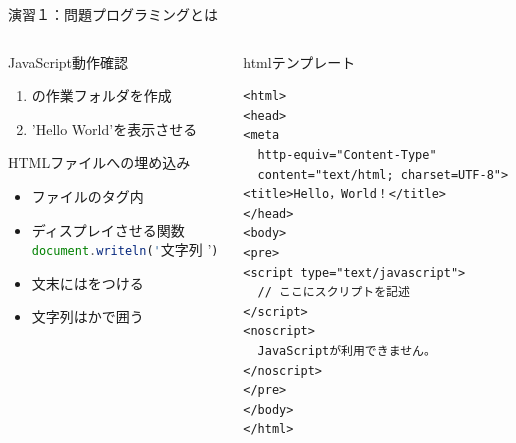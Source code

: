 \documentclass[dvipdfmx]{beamer}
\begin{document}
  \begin{frame}[fragile]{演習１：問題}{プログラミングとは}
    \begin{columns}
      \begin{column}{0.55\textwidth}
        \begin{large}JavaScript動作確認\end{large}
        \begin{enumerate}
          \setlength{\itemsep}{3mm}
          \item {}の作業フォルダを作成
          \item {\color{string}'Hello World'}を表示させる
        \end{enumerate}
        \vspace{5mm}
        \begin{large}HTMLファイルへの埋め込み\end{large}
        \begin{itemize}
          \setlength{\itemsep}{3mm}
          \item {}ファイルのタグ内
          \item ディスプレイさせる関数\\
          \lstinline[language=javascript]|document.writeln('|{\color{string}\footnotesize 文字列 '}\lstinline[language=javascript]|)|
          \item 文末にはをつける
          \item 文字列はかで囲う
        \end{itemize}
      \end{column}
      \begin{column}{0.45\textwidth}
        \begin{exampleblock}{htmlテンプレート}
          \begin{lstlisting}[language=html5,basicstyle=\tiny]
<html>
<head>
<meta
  http-equiv="Content-Type"
  content="text/html; charset=UTF-8">
<title>Hello，World！</title>
</head>
<body>
<pre>
<script type="text/javascript">
  // ここにスクリプトを記述
</script>
<noscript>
  JavaScriptが利用できません。
</noscript>
</pre>
</body>
</html>

          \end{lstlisting}
        \end{exampleblock}
      \end{column}
    \end{columns}
  \end{frame}
\end{document}
